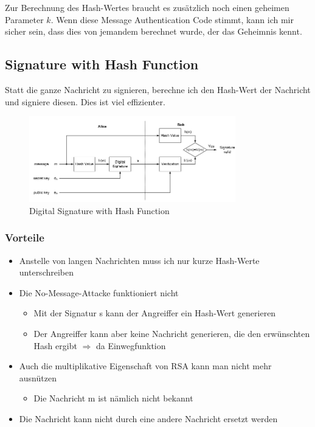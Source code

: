 Zur Berechnung des Hash-Wertes braucht es zusätzlich noch einen geheimen
Parameter $k$. Wenn diese Message Authentication Code stimmt, kann ich mir
sicher sein, dass dies von jemandem berechnet wurde, der das Geheimnis
kennt.

\hypertarget{signature-with-hash-function}{%
\subsection{Signature with Hash
Function}\label{signature-with-hash-function}}

Statt die ganze Nachricht zu signieren, berechne ich den Hash-Wert der
Nachricht und signiere diesen. Dies ist viel effizienter.

\begin{figure}[H]
\centering
\includegraphics[width=0.8\textwidth]{figures/digitanSignatureWithHash.png}
\caption{Digital Signature with Hash Function}
\end{figure}

\hypertarget{vorteile}{%
\subsubsection{Vorteile}\label{vorteile}}

\begin{itemize}
\tightlist
\item
  Anstelle von langen Nachrichten muss ich nur kurze Hash-Werte
  unterschreiben
\item
  Die No-Message-Attacke funktioniert nicht

  \begin{itemize}
  \tightlist
  \item
    Mit der Signatur s kann der Angreiffer ein Hash-Wert generieren
  \item
    Der Angreiffer kann aber keine Nachricht generieren, die den
    erwünschten Hash ergibt $\Rightarrow$ da Einwegfunktion
  \end{itemize}
\item
  Auch die multiplikative Eigenschaft von RSA kann man nicht mehr
  ausnützen

  \begin{itemize}
  \tightlist
  \item
    Die Nachricht m ist nämlich nicht bekannt
  \end{itemize}
\item
  Die Nachricht kann nicht durch eine andere Nachricht ersetzt werden
\end{itemize}

